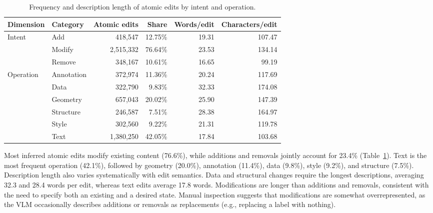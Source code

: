 \begin{table}[t]
\centering
\caption{Frequency and description length of atomic edits by intent and operation.}
\label{tab:daeditikz_edit_distribution}
\small
\setlength{\tabcolsep}{7pt}
\renewcommand{\arraystretch}{0.98}
\begin{tabular}{llrrrr}
\toprule
\textbf{Dimension} &
\textbf{Category} &
\textbf{Atomic edits} &
\textbf{Share} &
\textbf{Words/edit} &
\textbf{Characters/edit} \\
\midrule
\multirow{3}{*}{Intent}
& Add
& 418,547
& 12.75\%
& 19.31
& 107.47 \\
& Modify
& 2,515,332
& 76.64\%
& 23.53
& 134.14 \\
& Remove
& 348,167
& 10.61\%
& 16.65
& 99.19 \\
\midrule
\multirow{6}{*}{Operation}
& Annotation
& 372,974
& 11.36\%
& 20.24
& 117.69 \\
& Data
& 322,790
& 9.83\%
& 32.33
& 174.08 \\
& Geometry
& 657,043
& 20.02\%
& 25.90
& 147.39 \\
& Structure
& 246,587
& 7.51\%
& 28.38
& 164.97 \\
& Style
& 302,560
& 9.22\%
& 21.31
& 119.78 \\
& Text
& 1,380,250
& 42.05\%
& 17.84
& 103.68 \\
\bottomrule
\end{tabular}
\end{table}
Most inferred atomic edits modify existing content (76.6\%), while additions and removals jointly account for 23.4\% (Table~\ref{tab:daeditikz_edit_distribution}). Text is the most frequent operation (42.1\%), followed by geometry (20.0\%), annotation (11.4\%), data (9.8\%), style (9.2\%), and structure (7.5\%). Description length also varies systematically with edit semantics. Data and structural changes require the longest descriptions, averaging 32.3 and 28.4 words per edit, whereas text edits average 17.8 words. Modifications are longer than additions and removals, consistent with the need to specify both an existing and a desired state. Manual inspection suggests that modifications are somewhat overrepresented, as the VLM occasionally describes additions or removals as replacements (e.g., replacing a label with nothing).

